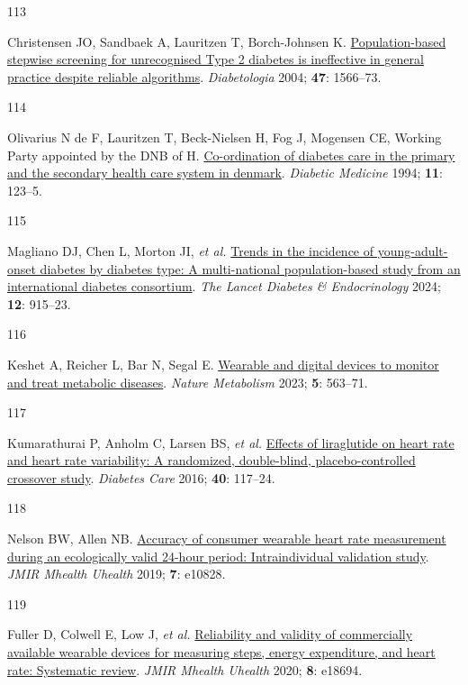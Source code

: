 \documentclass[
  a4paper,
  headsepline=true,
  open=any]{scrbook}
\newlength{\cslhangindent}
\newlength{\csllabelwidth}
\newlength{\cslentryspacingunit} %
\newenvironment{CSLReferences}[2] %
 {%
  \setlength{\parindent}{0pt}
  \ifodd #1
  \let\oldpar\par
  \def\par{\hangindent=\cslhangindent\oldpar}
  \fi
  \setlength{\parskip}{#2\cslentryspacingunit}
 }%
 {}
\newcommand{\CSLLeftMargin}[1]{\parbox[t]{\csllabelwidth}{#1}}
\newcommand{\CSLRightInline}[1]{\parbox[t]{\linewidth - \csllabelwidth}{#1}\break}
\begin{document}
\begin{CSLReferences}{0}{0}
\leavevmode{}%
\CSLLeftMargin{113 }%
\CSLRightInline{Christensen JO, Sandbaek A, Lauritzen T, Borch-Johnsen
K. \href{https://doi.org/10.1007/s00125-004-1496-2}{Population-based
stepwise screening for unrecognised Type 2 diabetes is ineffective in
general practice despite reliable algorithms}. \emph{Diabetologia} 2004;
\textbf{47}: 1566--73.}

\leavevmode{}%
\CSLLeftMargin{114 }%
\CSLRightInline{Olivarius N de F, Lauritzen T, Beck-Nielsen H, Fog J,
Mogensen CE, Working Party appointed by the DNB of H.
\href{https://doi.org/10.1111/j.1464-5491.1994.tb00243.x}{Co-ordination
of diabetes care in the primary and the secondary health care system in
denmark}. \emph{Diabetic Medicine} 1994; \textbf{11}: 123--5.}

\leavevmode{}%
\CSLLeftMargin{115 }%
\CSLRightInline{Magliano DJ, Chen L, Morton JI, \emph{et al.}
\href{https://doi.org/10.1016/S2213-8587(24)00243-2}{Trends in the
incidence of young-adult-onset diabetes by diabetes type: A
multi-national population-based study from an international diabetes
consortium}. \emph{The Lancet Diabetes \& Endocrinology} 2024;
\textbf{12}: 915--23.}

\leavevmode{}%
\CSLLeftMargin{116 }%
\CSLRightInline{Keshet A, Reicher L, Bar N, Segal E.
\href{https://doi.org/10.1038/s42255-023-00778-y}{Wearable and digital
devices to monitor and treat metabolic diseases}. \emph{Nature
Metabolism} 2023; \textbf{5}: 563--71.}

\leavevmode{}%
\CSLLeftMargin{117 }%
\CSLRightInline{Kumarathurai P, Anholm C, Larsen BS, \emph{et al.}
\href{https://doi.org/10.2337/dc16-1580}{Effects of liraglutide on heart
rate and heart rate variability: A randomized, double-blind,
placebo-controlled crossover study}. \emph{Diabetes Care} 2016;
\textbf{40}: 117--24.}

\leavevmode{}%
\CSLLeftMargin{118 }%
\CSLRightInline{Nelson BW, Allen NB.
\href{https://doi.org/10.2196/10828}{Accuracy of consumer wearable heart
rate measurement during an ecologically valid 24-hour period:
Intraindividual validation study}. \emph{JMIR Mhealth Uhealth} 2019;
\textbf{7}: e10828.}

\leavevmode{}%
\CSLLeftMargin{119 }%
\CSLRightInline{Fuller D, Colwell E, Low J, \emph{et al.}
\href{https://doi.org/10.2196/18694}{Reliability and validity of
commercially available wearable devices for measuring steps, energy
expenditure, and heart rate: Systematic review}. \emph{JMIR Mhealth
Uhealth} 2020; \textbf{8}: e18694.}

\end{CSLReferences}
\end{document}
